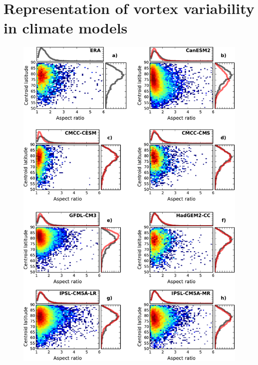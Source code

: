 \chapter{Representation of vortex variability in climate models}
\label{cha:models}


 \begin{figure}
 \centering
 \noindent\includegraphics[width=\textwidth]{figures/chapter-models/moments_stats1.pdf}
 \caption[]{}
 \label{Fig2}
 \end{figure}

